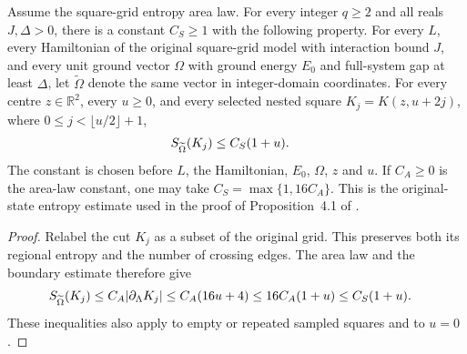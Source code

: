 \begin{theorem}
    \label{thm:peps_original_nested_entropy}
    Assume the square-grid entropy area law. For every integer $q\ge2$ and
    all reals $J,\Delta>0$, there is a constant $C_S\ge1$ with the following
    property. For every $L$, every Hamiltonian of the original square-grid
    model with interaction bound $J$, and every unit ground vector $\Omega$
    with ground energy $E_0$ and full-system gap at least $\Delta$, let
    $\widetilde\Omega$ denote the same vector in integer-domain coordinates.
    For every centre $z\in\mathbb R^2$, every $u\ge0$, and every selected
    nested square $K_j=K(z,u+2j)$, where $0\le j<\lfloor u/2\rfloor+1$,
    \begin{align}
        S_{\widetilde\Omega}(K_j) & \le C_S(1+u). \notag
    \end{align}
    The constant is chosen before $L$, the Hamiltonian, $E_0$, $\Omega$,
    $z$ and $u$. If $C_A\ge0$ is the area-law constant, one may take
    $C_S=\max\{1,16C_A\}$. This is the original-state entropy estimate used
    in the proof of Proposition~4.1 of \cite{OpenAI2026PolynomialPEPS}.
\end{theorem}
\begin{proof}
    Relabel the cut $K_j$ as a subset of the original grid. This preserves
    both its regional entropy and the number of crossing edges. The area
    law and the boundary estimate therefore give
    \begin{align}
        S_{\widetilde\Omega}(K_j)
         & \le C_A|\partial_\Lambda K_j|
        \le C_A(16u+4)
        \le 16C_A(1+u)
        \le C_S(1+u). \notag
    \end{align}
    These inequalities also apply to empty or repeated sampled squares
    and to $u=0$.
\end{proof}
